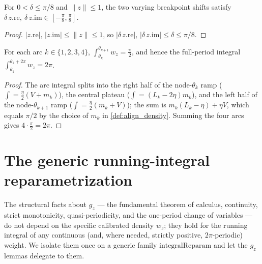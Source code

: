 \begin{lemma}

  \label{lem:align_delta_bounds}
  For $0<\delta\le\pi/8$ and $\|z\|\le1$, the two varying breakpoint shifts satisfy
  $\delta\,z.\mathrm{re},\ \delta\,z.\mathrm{im}\in[-\tfrac\pi8,\tfrac\pi8]$.
\end{lemma}
\begin{proof}
  \leanok
  $|z.\mathrm{re}|,\,|z.\mathrm{im}|\le\|z\|\le1$, so
  $|\delta\,z.\mathrm{re}|,\,|\delta\,z.\mathrm{im}|\le\delta\le\pi/8$.
\end{proof}

\begin{lemma}
  \label{lem:align_density_arc_integral}
  For each arc $k\in\{1,2,3,4\}$, $\int_{\theta_k}^{\theta_{k+1}}w_z=\tfrac\pi2$,
  and hence the full-period integral $\int_{\theta_1}^{\theta_1+2\pi}w_z=2\pi$.
\end{lemma}
\begin{proof}
  The arc integral splits into the right half of the node-$\theta_k$ ramp
  ($\int=\tfrac\eta2(V+m_k)$), the central plateau ($\int=(L_k-2\eta)m_k$), and the
  left half of the node-$\theta_{k+1}$ ramp ($\int=\tfrac\eta2(m_k+V)$); the sum is
  $m_k(L_k-\eta)+\eta V$, which equals $\pi/2$ by the choice of $m_k$ in
  \cref{def:align_density}. Summing the four arcs gives $4\cdot\tfrac\pi2=2\pi$.
\end{proof}

\section{The generic running-integral reparametrization}

The structural facts about $g_z$ --- the fundamental theorem of calculus,
continuity, strict monotonicity, quasi-periodicity, and the one-period change of
variables --- do not depend on the specific calibrated density $w_z$; they hold for
the running integral of any continuous (and, where needed, strictly positive,
$2\pi$-periodic) weight. We isolate them once on a generic family
$\mathrm{integralReparam}$ and let the $g_z$ lemmas delegate to them.

